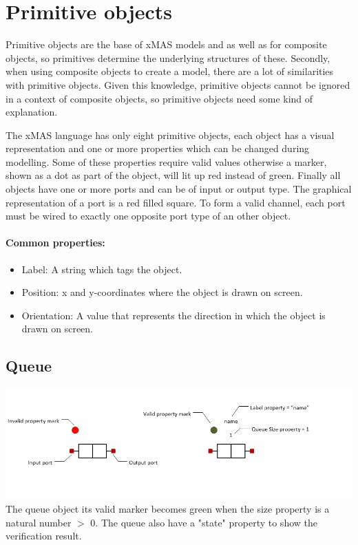 \documentclass[a4paper,11pt,final]{article}
\begin{document}
\newpage
\section{Primitive objects}
Primitive objects are the base of xMAS models and as well as for composite
objects, so primitives determine the underlying structures of these.
Secondly, when using composite objects to create a model, there are a lot of
similarities with primitive objects. Given this knowledge, primitive objects cannot
be ignored in a context of composite objects, so
primitive objects need some kind of explanation.

The xMAS language has only eight primitive objects,
each object has a visual representation and one or more properties which can be
changed during modelling. Some of these properties require valid
values otherwise a marker, shown as a dot as part of the object, will lit up red instead of
green. Finally all objects have one or more ports and can be of input or output
type. The graphical representation of a port is a red filled square. 
To form a valid channel, each port must be wired to exactly one
opposite port type of an other object.

\paragraph{Common properties:}
\begin{itemize}
\item Label: A string which tags the object.
\item Position: x and y-coordinates where the object is drawn on screen.
\item Orientation: A value that represents the direction in which the object is drawn on screen.
\end{itemize}

\subsection{Queue}
\includegraphics[width=1.0\textwidth]{queue}
The queue object its valid marker becomes green when the size property is a natural number $>$ 0. 
The queue also have a "state" property to show the verification result. 
\end{document}
